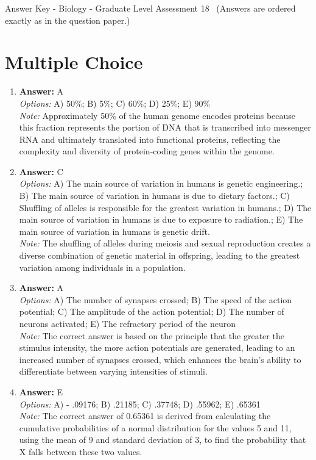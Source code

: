 \documentclass[12pt]{article}
\begin{document}
\begin{center}
Answer Key - Biology - Graduate Level Assessment 18 \
\small (Answers are ordered exactly as in the question paper.)
\end{center}

\section*{Multiple Choice}
\begin{enumerate}[label=\arabic*.]
\item \textbf{Answer:} A
\\ \textit{Options:} A) 50\%; B) 5\%; C) 60\%; D) 25\%; E) 90\%
\\ \textit{Note:} Approximately 50\% of the human genome encodes proteins because this fraction represents the portion of DNA that is transcribed into messenger RNA and ultimately translated into functional proteins, reflecting the complexity and diversity of protein-coding genes within the genome.
\item \textbf{Answer:} C
\\ \textit{Options:} A) The main source of variation in humans is genetic engineering.; B) The main source of variation in humans is due to dietary factors.; C) Shuffling of alleles is responsible for the greatest variation in humans.; D) The main source of variation in humans is due to exposure to radiation.; E) The main source of variation in humans is genetic drift.
\\ \textit{Note:} The shuffling of alleles during meiosis and sexual reproduction creates a diverse combination of genetic material in offspring, leading to the greatest variation among individuals in a population.
\item \textbf{Answer:} A
\\ \textit{Options:} A) The number of synapses crossed; B) The speed of the action potential; C) The amplitude of the action potential; D) The number of neurons activated; E) The refractory period of the neuron
\\ \textit{Note:} The correct answer is based on the principle that the greater the stimulus intensity, the more action potentials are generated, leading to an increased number of synapses crossed, which enhances the brain's ability to differentiate between varying intensities of stimuli.
\item \textbf{Answer:} E
\\ \textit{Options:} A) - .09176; B) .21185; C) .37748; D) .55962; E) .65361
\\ \textit{Note:} The correct answer of 0.65361 is derived from calculating the cumulative probabilities of a normal distribution for the values 5 and 11, using the mean of 9 and standard deviation of 3, to find the probability that X falls between these two values.

\end{enumerate}
\end{document}
